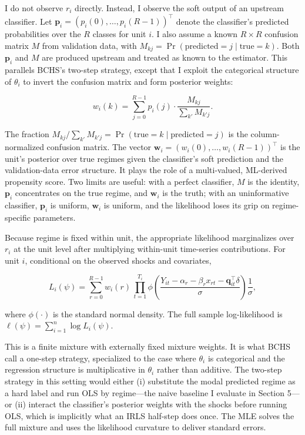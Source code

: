 \documentclass[
  12pt,
  letterpaper]{article}
\begin{document}
I do not observe \(r_i\) directly. Instead, I observe the soft output of
an upstream classifier. Let
\(\mathbf{p}_i = (p_i(0), \ldots, p_i(R-1))^{\top}\) denote the
classifier's predicted probabilities over the \(R\) classes for unit
\(i\). I also assume a known \(R \times R\) confusion matrix \(M\) from
validation data, with
\(M_{kj} = \Pr(\text{predicted} = j \mid \text{true} = k)\). Both
\(\mathbf{p}_i\) and \(M\) are produced upstream and treated as known to
the estimator. This parallels BCHS's two-step strategy, except that I
exploit the categorical structure of \(\theta_i\) to invert the
confusion matrix and form posterior weights:

\[
w_i(k) = \sum_{j=0}^{R-1} p_i(j) \cdot \frac{M_{kj}}{\sum_{k'} M_{k'j}}.
\]

The fraction
\(M_{kj} / \sum_{k'} M_{k'j} = \Pr(\text{true} = k \mid \text{predicted} = j)\)
is the column-normalized confusion matrix. The vector
\(\mathbf{w}_i = (w_i(0), \ldots, w_i(R-1))^{\top}\) is the unit's
posterior over true regimes given the classifier's soft prediction and
the validation-data error structure. It plays the role of a
multi-valued, ML-derived propensity score. Two limits are useful: with a
perfect classifier, \(M\) is the identity, \(\mathbf{p}_i\) concentrates
on the true regime, and \(\mathbf{w}_i\) is the truth; with an
uninformative classifier, \(\mathbf{p}_i\) is uniform, \(\mathbf{w}_i\)
is uniform, and the likelihood loses its grip on regime-specific
parameters.

Because regime is fixed within unit, the appropriate likelihood
marginalizes over \(r_i\) at the unit level after multiplying
within-unit time-series contributions. For unit \(i\), conditional on
the observed shocks and covariates,

\[
L_i(\psi) = \sum_{r=0}^{R-1} w_i(r) \, \prod_{t=1}^{T_i} \phi\!\left( \frac{Y_{it} - \alpha_r - \beta_r x_{rt} - \mathbf{q}_{it}^{\top}\delta}{\sigma} \right) \frac{1}{\sigma},
\]

where \(\phi(\cdot)\) is the standard normal density. The full sample
log-likelihood is \(\ell(\psi) = \sum_{i=1}^n \log L_i(\psi)\).

This is a finite mixture with externally fixed mixture weights. It is
what BCHS call a one-step strategy, specialized to the case where
\(\theta_i\) is categorical and the regression structure is
multiplicative in \(\theta_i\) rather than additive. The two-step
strategy in this setting would either (i) substitute the modal predicted
regime as a hard label and run OLS by regime---the naive baseline I
evaluate in Section 5---or (ii) interact the classifier's posterior
weights with the shocks before running OLS, which is implicitly what an
IRLS half-step does once. The MLE solves the full mixture and uses the
likelihood curvature to deliver standard errors.
\end{document}
